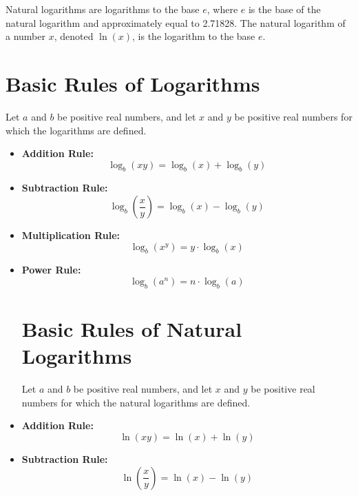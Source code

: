 \documentclass[a4paper,12pt]{article}
\begin{document}
Natural logarithms are logarithms to the base \( e \), where \( e \) is the base of the natural logarithm and approximately equal to 2.71828. The natural logarithm of a number \( x \), denoted \( \ln(x) \), is the logarithm to the base \( e \).

\section{Basic Rules of Logarithms}
Let \( a \) and \( b \) be positive real numbers, and let \( x \) and \( y \) be positive real numbers for which the logarithms are defined.
\begin{itemize}

\item \textbf{Addition Rule:}
\begin{equation}
    \log_b(xy) = \log_b(x) + \log_b(y)
\end{equation}

\item \textbf{Subtraction Rule:}
\begin{equation}
    \log_b\left(\frac{x}{y}\right) = \log_b(x) - \log_b(y)
\end{equation}

\item \textbf{Multiplication Rule:}
\begin{equation}
    \log_b(x^y) = y \cdot \log_b(x)
\end{equation}

\item\textbf{Power Rule:}
\begin{equation}
    \log_b(a^n) = n \cdot \log_b(a)
\end{equation}

\section{Basic Rules of Natural Logarithms}
Let \( a \) and \( b \) be positive real numbers, and let \( x \) and \( y \) be positive real numbers for which the natural logarithms are defined.

\item \textbf{Addition Rule:}
\begin{equation}
    \ln(xy) = \ln(x) + \ln(y)
\end{equation}

\item \textbf{Subtraction Rule:}
\begin{equation}
    \ln\left(\frac{x}{y}\right) = \ln(x) - \ln(y)
\end{equation}


\end{itemize}
\end{document}

